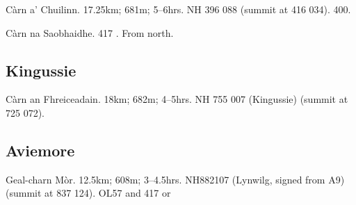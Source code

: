\begin{munros}
\item
Càrn a' Chuilinn.  17.25km; 681m; 5--6hrs.  NH 396 088 (summit at 416 034).
400.

\item
Càrn na Saobhaidhe.  417 \buy.  From north. 
\end{munros}


\subsection{Kingussie}

\begin{munros}
\item
Càrn an Fhreiceadain.  18km; 682m; 4--5hrs.  NH 755 007 (Kingussie) (summit at
725 072).
\end{munros}


\subsection{Aviemore}

\begin{munros}
\item
Geal-charn Mòr.  12.5km; 608m; 3--4.5hrs.  NH882107 (Lynwilg, signed from A9)
(summit at 837 124).  OL57 and 417 \buy or \needsPrintout
\end{munros}
